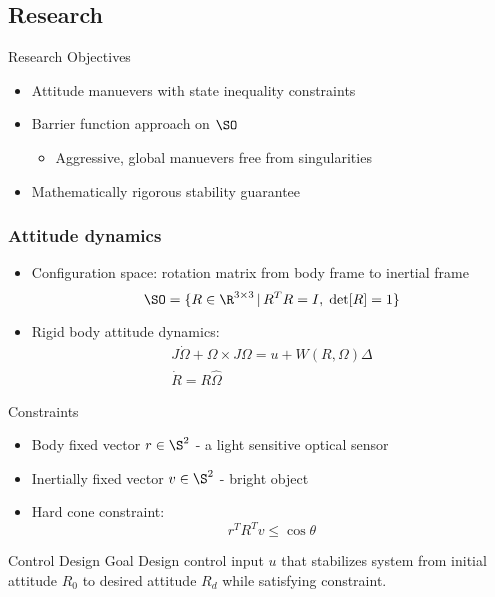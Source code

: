 \documentclass[11pt,professionalfonts]{beamer}
\begin{document}
\subsection{Research}

\begin{frame}{Research Objectives}
\begin{itemize}
	\item Attitude manuevers with state inequality constraints
	\item Barrier function approach on \( \SO \) 
	\begin{itemize}
		\item Aggressive, global manuevers free from singularities
	\end{itemize}
	\item Mathematically rigorous stability guarantee
\end{itemize}
\end{frame}

\begin{frame} %
\frametitle{Attitude dynamics} 
\begin{itemize}

	\item Configuration space: rotation matrix from body frame to inertial frame
	 \[\SO =  \{R\in\R^{3\times 3}\,|\, R^TR=I,\;\mathrm{det}[R]=1\} \]
	\item Rigid body attitude dynamics:
\begin{gather*}
	J\dot\Omega + \Omega\times J\Omega = u+W(R,\Omega)\Delta \\
	\dot R = R\hat\Omega 
\end{gather*}
\end{itemize}

\end{frame}   %

\begin{frame}{Constraints} %
	\begin{itemize}
		\item Body fixed vector \( r \in \S^2\) - a light sensitive optical sensor
		\item Inertially fixed vector \( v \in \S^2 \) - bright object 
		\item Hard cone constraint:
		\[
			r^T R^T v \leq \cos \theta
		\]
	\end{itemize}
	\pause
	\begin{block}{Control Design Goal}
		Design control input \( u \) that stabilizes system from initial attitude \( R_0 \) to desired attitude \( R_d \) while satisfying constraint.
	\end{block}
\end{frame}%
\end{document}
